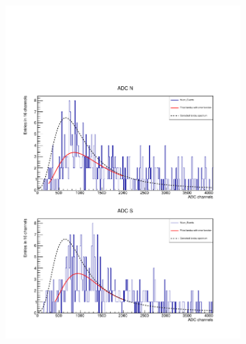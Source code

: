 \begin{figure}[ht]
\begin{subfigure}{0.7\linewidth}
    \includegraphics[width=\linewidth{}]{./fig/124M6CorrectedLandau.pdf}
    \caption{}
    \label{fig:eff_lateM6}
  \end{subfigure}
\end{figure}
